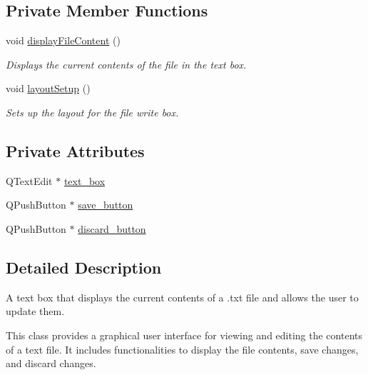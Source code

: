 \subsection*{Private Member Functions}
\begin{DoxyCompactItemize}
\item 
\mbox{\label{classFileWriteBox_a3bd2a29dba4e0815348219071703654d}} 
void \hyperlink{classFileWriteBox_a3bd2a29dba4e0815348219071703654d}{display\+File\+Content} ()
\begin{DoxyCompactList}\small\item\em Displays the current contents of the file in the text box. \end{DoxyCompactList}\item 
\mbox{\label{classFileWriteBox_a55790801cd79bb5a36384c167825f507}} 
void \hyperlink{classFileWriteBox_a55790801cd79bb5a36384c167825f507}{layout\+Setup} ()
\begin{DoxyCompactList}\small\item\em Sets up the layout for the file write box. \end{DoxyCompactList}\end{DoxyCompactItemize}
\subsection*{Private Attributes}
\begin{DoxyCompactItemize}
\item 
Q\+Text\+Edit $\ast$ \hyperlink{classFileWriteBox_a0dd330297bb74bcfdda915aeb7561fb6}{text\+\_\+box}
\item 
Q\+Push\+Button $\ast$ \hyperlink{classFileWriteBox_a2ed017f414c666d3e31cb02cd39d909d}{save\+\_\+button}
\item 
Q\+Push\+Button $\ast$ \hyperlink{classFileWriteBox_ae6599208365ef57c160e99e67f7ebe15}{discard\+\_\+button}
\end{DoxyCompactItemize}


\subsection{Detailed Description}
A text box that displays the current contents of a .txt file and allows the user to update them. 

This class provides a graphical user interface for viewing and editing the contents of a text file. It includes functionalities to display the file contents, save changes, and discard changes.

